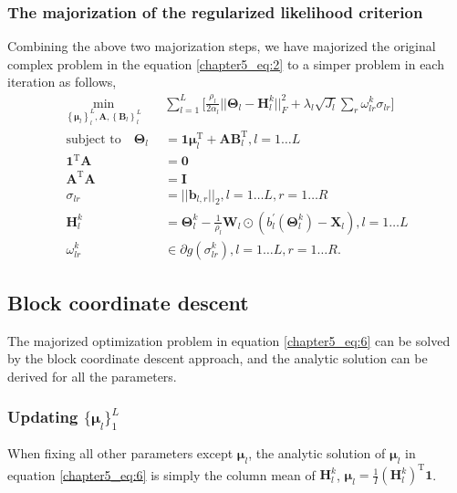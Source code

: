 \subsubsection*{The majorization of the regularized likelihood criterion}
Combining the above two majorization steps, we have majorized the original complex problem in the equation \ref{chapter5_eq:2} to a simper problem in each iteration as follows,
\begin{equation}\label{chapter5_eq:6}
\begin{aligned}
    \min_{ \left\{\bm{\mu}_l\right\}_{l}^{L}, \mathbf{A}, \left\{\mathbf{B}_l\right\}_{l}^{L}} \quad & \sum_{l=1}^{L}\Big[ \frac{\rho_l}{2\alpha_l} ||\mathbf{\Theta}_l - \mathbf{H}_{l}^{k}||_F^2  + \lambda_l \sqrt{J_l} \sum_{r} \omega_{lr}^k \sigma_{lr} \Big] \\
    \text{subject to} \quad \mathbf{\Theta}_l &= \mathbf{1}\bm{\mu}_l^{\text{T}} + \mathbf{AB}_l^{\text{T}}, l = 1 \ldots L \\
     \mathbf{1}^{\text{T}}\mathbf{A} &= \mathbf{0}\\
	 \mathbf{A}^{\text{T}}\mathbf{A} &= \mathbf{I} \\
	 \sigma_{lr} &= ||\mathbf{b}_{l,r}||_2, l = 1 \ldots L, r = 1 \ldots R\\
\mathbf{H}_{l}^{k} &= \mathbf{\Theta}_l^k - \frac{1}{\rho_l} \mathbf{W}_l \odot (b_l^{'}(\mathbf{\Theta}_{l}^{k}) - \mathbf{X}_l), l = 1 \ldots L \\
\omega_{lr}^k &\in \partial g(\sigma_{lr}^k), l = 1 \ldots L, r = 1 \ldots R.
\end{aligned}
\end{equation}

\subsection{Block coordinate descent}
The majorized optimization problem in equation \ref{chapter5_eq:6} can be solved by the block coordinate descent approach, and the analytic solution can be derived for all the parameters.

\subsubsection*{Updating $\{ \bm{\mu}_l \}_{1}^{L}$}
When fixing all other parameters except $\bm{\mu}_l$, the analytic solution of $\bm{\mu}_l$ in equation \ref{chapter5_eq:6} is simply the column mean of $\mathbf{H}_l^k$, $\bm{\mu}_l = \frac{1}{I} (\mathbf{H}_l^k)^{\text{T}} \mathbf{1}$.

